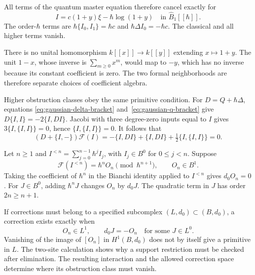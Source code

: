 All terms of the quantum master equation therefore cancel exactly for
\begin{equation}\label{eq:gaussian-completed-action}
 I=c(1+y)\xi-\hbar\log(1+y)
       \quad\text{in }\widehat B_1[[\hbar]].
\end{equation}
The order-$\hbar$ terms are
$\hbar\{I_0,I_1\}=\hbar c$ and
$\hbar\Delta I_0=-\hbar c$.
The classical and all higher terms vanish.

There is no unital homomorphism $k[[x]]\to k[[y]]$ extending
$x\mapsto1+y$. The unit $1-x$, whose inverse is $\sum_{m\geq0}x^m$,
would map to $-y$, which has no inverse because its constant coefficient
is zero. The two formal neighborhoods are therefore separate choices
of coefficient algebra.

Higher obstruction classes obey the same primitive condition.
For $D=Q+\hbar\Delta$, equations
\eqref{eq:gaussian-delta-bracket} and~\eqref{eq:gaussian-q-bracket}
give $D\{I,I\}=-2\{I,DI\}$.
Jacobi with three degree-zero inputs equal to $I$ gives
$3\{I,\{I,I\}\}=0$, hence $\{I,\{I,I\}\}=0$.
It follows that
\[
 (D+\{I,-\})\mathcal F(I)
 =-\{I,DI\}+\{I,DI\}+\tfrac12\{I,\{I,I\}\}=0.
\]

Let $n\geq1$ and $I^{<n}=\sum_{j=0}^{n-1}\hbar^jI_j$, with
$I_j\in B^0$ for $0\leq j<n$.
Suppose
\[
 \mathcal F(I^{<n})=\hbar^nO_n\pmod{\hbar^{n+1}},
 \qquad O_n\in B^1.
\]
Taking the coefficient of $\hbar^n$ in the Bianchi identity applied to
$I^{<n}$ gives $d_0O_n=0$.
For $J\in B^0$, adding $\hbar^nJ$ changes $O_n$ by $d_0J$.
The quadratic term in $J$ has order $2n\geq n+1$.

If corrections must belong to a specified subcomplex
$(L,d_0)\subset(B,d_0)$, a correction exists exactly when
\[
 O_n\in L^1,\qquad d_0J=-O_n\quad\text{for some }J\in L^0.
\]
Vanishing of the image of $[O_n]$ in $H^1(B,d_0)$ does not by itself
give a primitive in $L$.
The two-site calculation shows why a support restriction must be checked
after elimination. The resulting interaction and the allowed correction
space determine where its obstruction class must vanish.
